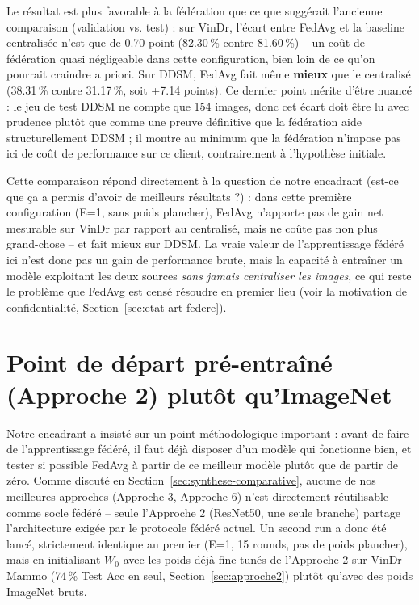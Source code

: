 \documentclass[12pt,a4paper]{report}
\begin{document}
Le résultat est plus favorable à la fédération que ce que suggérait
l'ancienne comparaison (validation vs. test) : sur VinDr, l'écart entre
FedAvg et la baseline centralisée n'est que de 0.70 point (82.30\,\% contre
81.60\,\%) -- un coût de fédération quasi négligeable dans cette
configuration, bien loin de ce qu'on pourrait craindre a priori. Sur DDSM,
FedAvg fait même \textbf{mieux} que le centralisé (38.31\,\% contre
31.17\,\%, soit +7.14 points). Ce dernier point mérite d'être nuancé : le
jeu de test DDSM ne compte que 154 images, donc cet écart doit être lu avec
prudence plutôt que comme une preuve définitive que la fédération
\og{}aide\fg{} structurellement DDSM ; il montre au minimum que la
fédération n'impose pas ici de coût de performance sur ce client, contrairement à
l'hypothèse initiale.

Cette comparaison répond directement à la question de notre encadrant
(\og{}est-ce que ça a permis d'avoir de meilleurs résultats ?\fg{}) : dans
cette première configuration (E=1, sans poids plancher), FedAvg n'apporte
pas de gain net mesurable sur VinDr par rapport au centralisé, mais ne
coûte pas non plus grand-chose -- et fait mieux sur DDSM. La vraie valeur
de l'apprentissage fédéré ici n'est donc pas un gain de performance brute,
mais la capacité à entraîner un modèle exploitant les deux sources
\emph{sans jamais centraliser les images}, ce qui reste le problème que
FedAvg est censé résoudre en premier lieu (voir la motivation de
confidentialité, Section~\ref{sec:etat-art-federe}).

\section{Point de départ pré-entraîné (Approche 2) plutôt qu'ImageNet}
\label{sec:federe-pretrained}

Notre encadrant a insisté sur un point méthodologique important : avant de
faire de l'apprentissage fédéré, il faut déjà disposer d'un modèle qui
fonctionne bien, et tester si possible FedAvg à partir de ce meilleur
modèle plutôt que de partir de zéro. Comme discuté en
Section~\ref{sec:synthese-comparative}, aucune de nos meilleures approches
(Approche 3, Approche 6) n'est directement réutilisable comme socle fédéré
-- seule l'Approche 2 (ResNet50, une seule branche) partage l'architecture
exigée par le protocole fédéré actuel. Un second run a donc été lancé,
strictement identique au premier (E=1, 15 rounds, pas de poids plancher),
mais en initialisant $W_0$ avec les poids déjà fine-tunés de l'Approche 2
sur VinDr-Mammo (74\,\% Test Acc en seul, Section~\ref{sec:approche2})
plutôt qu'avec des poids ImageNet bruts.
\end{document}
